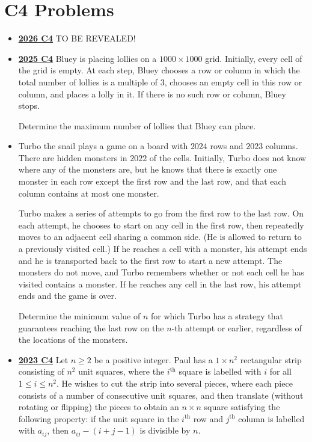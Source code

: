 \documentclass[11pt]{scrartcl}
\begin{document}
\section*{C4 Problems}  \label{C4}
\begin{itemize}[leftmargin=*]


\item \href{https://www.imo-official.org/assets/documents/problems/2026/IMO2026SL.pdf}{\textbf{2026 C4}} TO BE REVEALED!

\item \href{https://artofproblemsolving.com/community/c6h3866872p38676989}{\textbf{2025 C4}} Bluey is placing lollies on a $1000\times1000$ grid. Initially, every cell of the grid is empty. At each step, Bluey chooses a row or column in which the total number of lollies is a multiple of $3$, chooses an empty cell in this row or column, and places a lolly in it. If there is no such row or column, Bluey stops.

Determine the maximum number of lollies that Bluey can place.
\item {} Turbo the snail plays a game on a board with $2024$ rows and $2023$ columns. There are hidden monsters in $2022$ of the cells. Initially, Turbo does not know where any of the monsters are, but he knows that there is exactly one monster in each row except the first row and the last row, and that each column contains at most one monster.

Turbo makes a series of attempts to go from the first row to the last row. On each attempt, he chooses to start on any cell in the first row, then repeatedly moves to an adjacent cell sharing a common side. (He is allowed to return to a previously visited cell.) If he reaches a cell with a monster, his attempt ends and he is transported back to the first row to start a new attempt. The monsters do not move, and Turbo remembers whether or not each cell he has visited contains a monster. If he reaches any cell in the last row, his attempt ends and the game is over.

Determine the minimum value of $n$ for which Turbo has a strategy that guarantees reaching the last row on the $n$-th attempt or earlier, regardless of the locations of the monsters.
\item \href{https://artofproblemsolving.com/community/c6h3359724p31218375}{\textbf{2023 C4}} Let $n\geqslant  2$ be a positive integer. Paul has a $1\times n^2$ rectangular strip consisting of $n^2$ unit squares, where the $i^{\text{th}}$ square is labelled with $i$ for all $1\leqslant i\leqslant n^2$. He wishes to cut the strip into several pieces, where each piece consists of a number of consecutive unit squares, and then translate (without rotating or flipping) the pieces to obtain an $n\times n$ square satisfying the following property: if the unit square in the $i^{\text{th}}$ row and $j^{\text{th}}$ column is labelled with $a_{ij}$, then $a_{ij}-(i+j-1)$ is divisible by $n$.


\end{itemize}
\end{document}
